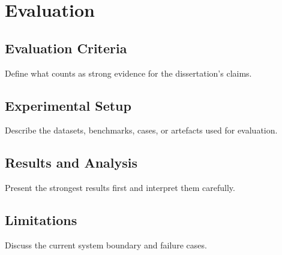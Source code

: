 \chapter{Evaluation}

\section{Evaluation Criteria}
Define what counts as strong evidence for the dissertation's claims.

\section{Experimental Setup}
Describe the datasets, benchmarks, cases, or artefacts used for evaluation.

\section{Results and Analysis}
Present the strongest results first and interpret them carefully.

\section{Limitations}
Discuss the current system boundary and failure cases.
